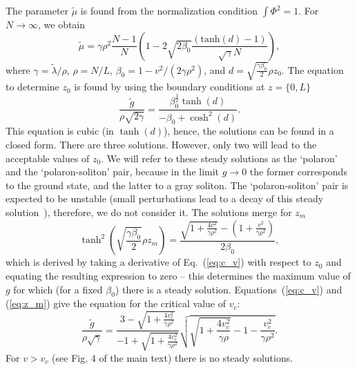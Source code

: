 \documentclass[reprint, twocolumn,amsmath,amssymb,showpacs,pra,superscriptaddress,aps]{revtex4-1}
\begin{document}
The parameter $\tilde \mu$ is found from the normalization condition $\int \Phi^2=1$. For $N\to\infty$, we obtain
\begin{equation}
\tilde \mu=\gamma \rho^2 \frac{N-1}{N}\left(1-2\sqrt{2\beta_0} \frac{ (\mathrm{tanh}(d)-1)}{\sqrt{\gamma}N}\right),
\end{equation}
where $\gamma=\tilde \lambda /\rho$, $\rho=N/L$, $\beta_0=1-v^2/(2\gamma \rho^2)$, and $d=\sqrt{\frac{\gamma \beta_0}{2}}\rho z_0$.
The equation to determine $z_0$ is found by using the boundary conditions at $z=\{0,L\}$
\begin{equation}
\frac{\tilde g}{\rho \sqrt{2\gamma}}=\frac{\beta_0^{\frac{3}{2}}\tanh(d)}{-\beta_0+\cosh^2(d)}.
\label{eq:c_v}
\end{equation}
This equation is cubic (in $\tanh(d)$), hence, the solutions can be found in a closed form.
There are three solutions. However, only two will lead to the acceptable values of $z_0$. 
We will refer to these steady solutions as the `polaron' and the `polaron-soliton' pair, because in the limit $g\to 0$ the former 
corresponds to the ground state, and the latter to a gray soliton. 
The `polaron-soliton' pair is expected to be unstable (small perturbations lead to 
a decay of this steady solution~\cite{hakim1997}),
therefore, we do not consider it. The solutions merge for $z_m$ 
\begin{equation}
\tanh^2\left(\sqrt{\frac{\gamma \beta_0}{2}}\rho z_m\right)=\frac{\sqrt{1+\frac{4v^2}{\gamma \rho^2}}-(1+\frac{v^2}{\gamma \rho^2})}{2\beta_0},
\label{eq:z_m}
\end{equation}
which is derived by taking a derivative of Eq.~(\ref{eq:c_v}) with respect to $z_0$ and equating the resulting expression to zero -- this determines 
the maximum value of $g$ for which (for a fixed $\beta_0$) there is a steady solution.
Equations~(\ref{eq:c_v}) and (\ref{eq:z_m}) give the equation for the critical value of $v_c$:
\begin{equation}
\frac{\tilde g}{\rho\sqrt{\gamma}}=\frac{3-\sqrt{1+\frac{4v_c^2}{\gamma \rho^2}}}{-1+\sqrt{1+\frac{4v_c^2}{\gamma \rho^2}}}\sqrt{\sqrt{1+\frac{4v_c^2}{\gamma \rho}}-1-\frac{v_c^2}{\gamma\rho^2}}.
\end{equation}
For $v>v_c$ (see Fig. 4 of the main text) there is no steady solutions.
\end{document}
